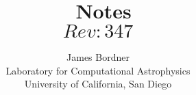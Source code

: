\documentclass{article}
\begin{document}
\title{ {\cello\ Notes}  \\ \vspace{0.1in}
     \vspace{-0.1in} $Rev: 347 $ }
\author{ James Bordner \\
        Laboratory for Computational Astrophysics\\
        University of California, San Diego}
\maketitle

\end{document}
